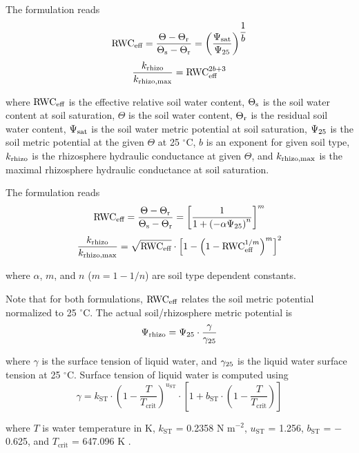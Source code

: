 \documentclass[twoside,10pt]{report}
\begin{document}
\par The \cite{brooks1964hydraulic} formulation reads
\begin{equation}
    \text{RWC}_\text{eff} = \dfrac{\Theta - \Theta_\text{r}}{\Theta_\text{s} - \Theta_\text{r}} = 
              \left( \dfrac{\Psi_\text{sat}}{\Psi_\text{25}} \right) ^ {\dfrac{1}{b}}
\end{equation}
\begin{equation}
    \dfrac{k_\text{rhizo}}{k_\text{rhizo,max}} = \text{RWC}_\text{eff} ^ {2b + 3}
\end{equation}
\par \noindent where $\text{RWC}_\text{eff}$ is the effective relative soil water content, $\Theta_\text{s}$ is the soil water content at soil saturation, $\Theta$ is the soil water content, $\Theta_\text{r}$ is the residual soil water content, $\Psi_\text{sat}$ is the soil water metric potential at soil saturation, $\Psi_\text{25}$ is the soil metric potential at the given $\Theta$ at 25 $^\circ$C, $b$ is an exponent for given soil type, $k_\text{rhizo}$ is the rhizosphere hydraulic conductance at given $\Theta$, and $k_\text{rhizo,max}$ is the maximal rhizosphere hydraulic conductance at soil saturation.

\par The \cite{van1980closed} formulation reads
\begin{equation}
    \text{RWC}_\text{eff} = \dfrac{\Theta - \Theta_\text{r}}{\Theta_\text{s} - \Theta_\text{r}} = 
              \left[ \dfrac{1}{1 + \left( -\alpha \Psi_\text{25} \right) ^ n} \right] ^ m
\end{equation}
\begin{equation}
    \dfrac{k_\text{rhizo}}{k_\text{rhizo,max}} =
        \sqrt{\text{RWC}_\text{eff}} \cdot \left[ 1 - \left(1 - \text{RWC}_\text{eff} ^ {1/m} \right) ^ m \right] ^ 2
\end{equation}
\par \noindent where $\alpha$, $m$, and $n$ ($m = 1 - 1/n$) are soil type dependent constants.

\par Note that for both formulations, $\text{RWC}_\text{eff}$ relates the soil metric potential normalized to 25 $^\circ$C. The actual soil/rhizosphere metric potential is
\begin{equation}
    \Psi_\text{rhizo} = \Psi_\text{25} \cdot \dfrac{\gamma}{\gamma_\text{25}}
\end{equation}
\par \noindent where $\gamma$ is the surface tension of liquid water, and $\gamma_\text{25}$ is the liquid water surface tension at 25 $^\circ$C. Surface tension of liquid water is computed using
\begin{equation}
    \gamma = k_\text{ST} \cdot 
             \left( 1 - \dfrac{T}{T_\text{crit}} \right) ^ {u_\text{ST}} \cdot
             \left[ 1 + b_\text{ST} \cdot \left( 1 - \dfrac{T}{T_\text{crit}} \right) \right]
    \label{eq:surface_tension}
\end{equation}
\par \noindent where $T$ is water temperature in K, $k_\text{ST}$ = 0.2358 N m$^{-2}$, $u_\text{ST}$ = 1.256, $b_\text{ST}$ = $-$0.625, and $T_\text{crit}$ = 647.096 K \citep{petrova2014revised}.
\end{document}

